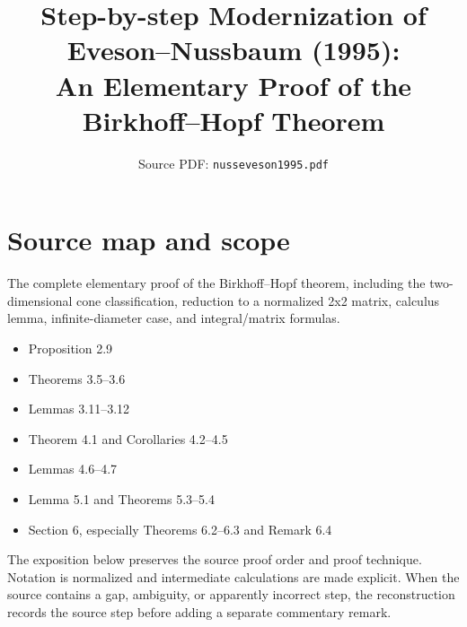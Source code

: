 
\DeclareMathOperator{\co}{co}
\DeclareMathOperator{\spanop}{span}
\DeclareMathOperator{\intopn}{int}
\newcommand{\coneleq}[1]{\le_{#1}}
\newcommand{\comp}[1]{\sim_{#1}}
\newcommand{\clos}[1]{\overline{#1}}
\newcommand{\bdry}[1]{\partial #1}
\newcommand{\K}{K}
\title{Step-by-step Modernization of Eveson--Nussbaum (1995):\\An Elementary Proof of the Birkhoff--Hopf Theorem}
\author{}
\date{Source PDF: \texttt{nusseveson1995.pdf}}

\maketitle

\section*{Source map and scope}
\begin{description}[style=nextline,leftmargin=3.2cm,labelwidth=3cm]
\item[Primary source] \texttt{}
\item[Coverage] The complete elementary proof of the Birkhoff--Hopf theorem, including the two-dimensional cone classification, reduction to a normalized 2x2 matrix, calculus lemma, infinite-diameter case, and integral/matrix formulas.
\item[Source anchors]
\begin{itemize}[leftmargin=2em]
  \item Proposition 2.9
  \item Theorems 3.5--3.6
  \item Lemmas 3.11--3.12
  \item Theorem 4.1 and Corollaries 4.2--4.5
  \item Lemmas 4.6--4.7
  \item Lemma 5.1 and Theorems 5.3--5.4
  \item Section 6, especially Theorems 6.2--6.3 and Remark 6.4
\end{itemize}
\end{description}

The exposition below preserves the source proof order and proof technique.  Notation is normalized
and intermediate calculations are made explicit.  When the source contains a gap, ambiguity, or
apparently incorrect step, the reconstruction records the source step before adding a separate
commentary remark.

